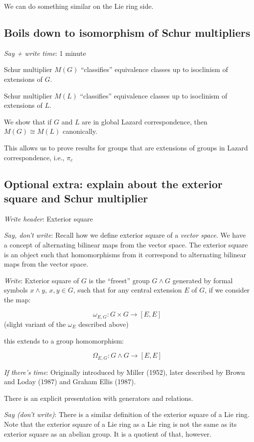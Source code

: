 \documentclass[10pt]{amsart}
\begin{document}
We can do something similar on the Lie ring side.

\subsection{Boils down to isomorphism of Schur multipliers}

{\em Say + write time}: 1 minute

Schur multiplier $M(G)$ ``classifies'' equivalence classes up to
isoclinism of extensions of $G$.

Schur multiplier $M(L)$ ``classifies'' equivalence classes up to
isoclinism of extensions of $L$.

We show that if $G$ and $L$ are in global Lazard correspondence, then
$M(G) \cong M(L)$ canonically.

This allows us to prove results for groups that are extensions of
groups in Lazard correspondence, i.e., $\pi_c$ 


\subsection{Optional extra: explain about the exterior square and Schur multiplier}

{\em Write header}: Exterior square

{\em Say, don't write}: Recall how we define exterior square of a {\em
  vector space}. We have a concept of alternating bilinear maps from
the vector space. The exterior square is an object such that
homomorphisms from it correspond to alternating bilinear maps from the
vector space.

{\em Write}: Exterior square of $G$ is the ``freest'' group $G \wedge G$
generated by formal symbols $x \wedge y$, $x,y \in G$, such that for
any central extension $E$ of $G$, if we consider the map:

$$\omega_{E,G}: G \times G \to [E,E]$$ (slight variant of the
$\omega_E$ described above)

this extends to a group homomorphism:

$$\Omega_{E,G}: G \wedge G \to [E,E]$$

{\em If there's time}: Originally introduced by Miller (1952), later
described by Brown and Loday (1987) and Graham Ellis (1987).

There is an explicit presentation with generators and relations.

{\em Say (don't write)}: There is a similar definition of the exterior
square of a Lie ring. Note that the exterior square of a Lie ring as a
Lie ring is not the same as its exterior square as an abelian
group. It is a quotient of that, however.
\end{document}

